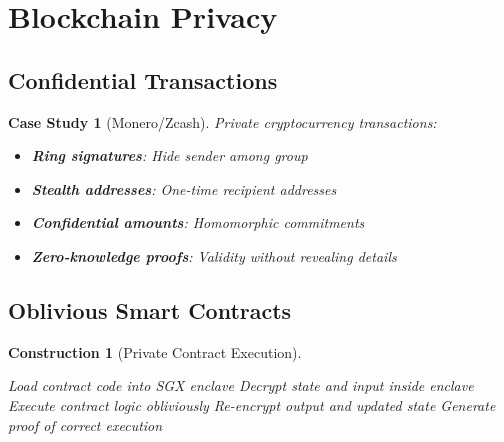 \documentclass[11pt,final,hidelinks]{article}
\newtheorem{construction}[theorem]{Construction}
\newtheorem{casestudy}[theorem]{Case Study}
\begin{document}
\section{Blockchain Privacy}

\subsection{Confidential Transactions}

\begin{casestudy}[Monero/Zcash]
Private cryptocurrency transactions:
\begin{itemize}
    \item \textbf{Ring signatures}: Hide sender among group
    \item \textbf{Stealth addresses}: One-time recipient addresses
    \item \textbf{Confidential amounts}: Homomorphic commitments
    \item \textbf{Zero-knowledge proofs}: Validity without revealing details
\end{itemize}
\end{casestudy}

\subsection{Oblivious Smart Contracts}

\begin{construction}[Private Contract Execution]
\begin{algorithm}[H]
\caption{Oblivious Smart Contract}
Load contract code into SGX enclave\;
Decrypt state and input inside enclave\;
Execute contract logic obliviously\;
Re-encrypt output and updated state\;
Generate proof of correct execution\;
\end{algorithm}
\end{construction}
\end{document}

